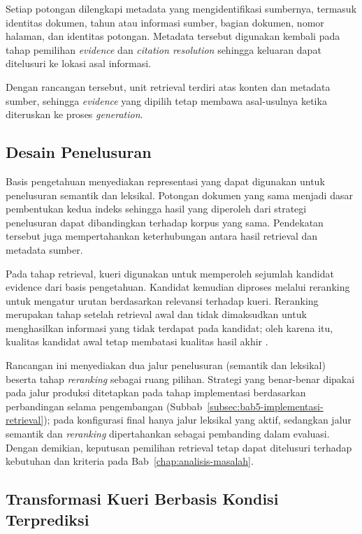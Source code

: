 Setiap potongan dilengkapi metadata yang mengidentifikasi sumbernya, termasuk identitas dokumen, tahun atau informasi sumber, bagian dokumen, nomor halaman, dan identitas potongan.
Metadata tersebut digunakan kembali pada tahap pemilihan \textit{evidence} dan \textit{citation resolution} sehingga keluaran dapat ditelusuri ke lokasi asal informasi.

Dengan rancangan tersebut, unit retrieval terdiri atas konten dan metadata sumber, sehingga \textit{evidence} yang dipilih tetap membawa asal-usulnya ketika diteruskan ke
proses \textit{generation}.

\subsection{Desain Penelusuran} 
\label{subsec:bab4-desain-penelusuran}

Basis pengetahuan menyediakan representasi yang dapat digunakan untuk penelusuran semantik dan leksikal. Potongan dokumen yang sama menjadi dasar pembentukan kedua indeks sehingga hasil
yang diperoleh dari strategi penelusuran dapat dibandingkan terhadap korpus yang sama. Pendekatan tersebut juga mempertahankan keterhubungan antara hasil retrieval dan metadata sumber.

Pada tahap retrieval, kueri digunakan untuk memperoleh sejumlah kandidat evidence dari basis pengetahuan. Kandidat kemudian diproses melalui reranking untuk mengatur urutan
berdasarkan relevansi terhadap kueri. Reranking merupakan tahap setelah retrieval awal dan tidak dimaksudkan untuk menghasilkan informasi yang tidak terdapat pada kandidat; oleh karena
itu, kualitas kandidat awal tetap membatasi kualitas hasil akhir \parencite{carbonell1998}.

Rancangan ini menyediakan dua jalur penelusuran (semantik dan leksikal) beserta tahap \textit{reranking} sebagai ruang pilihan. Strategi yang benar-benar dipakai pada jalur produksi
ditetapkan pada tahap implementasi berdasarkan perbandingan selama pengembangan (Subbab~\ref{subsec:bab5-implementasi-retrieval}); pada konfigurasi final hanya jalur leksikal
yang aktif, sedangkan jalur semantik dan \textit{reranking} dipertahankan sebagai pembanding dalam evaluasi. Dengan demikian, keputusan pemilihan retrieval tetap dapat ditelusuri
terhadap kebutuhan dan kriteria pada Bab~\ref{chap:analisis-masalah}.

\subsection{Transformasi Kueri Berbasis Kondisi Terprediksi} 
\label{subsec:bab4-query-transformation-prediksi}

